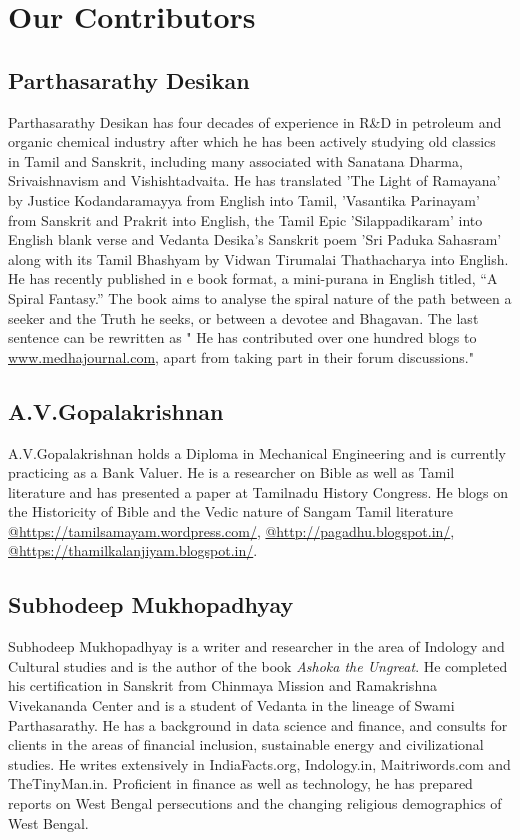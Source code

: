 
\chapter*{Our Contributors }\label{contributors}

\section*{Parthasarathy Desikan}

Parthasarathy Desikan has four decades of experience in R\&D in petroleum and organic chemical industry after which he has been actively studying old classics in Tamil and Sanskrit, including many associated with Sanatana Dharma, Srivaishnavism and Vishishtadvaita. He has translated 'The Light of Ramayana' by Justice Kodandaramayya from English into Tamil, 'Vasantika Parinayam' from Sanskrit and Prakrit into English, the Tamil Epic 'Silappadikaram' into English blank verse and Vedanta Desika’s Sanskrit poem 'Sri Paduka Sahasram' along with its Tamil Bhashyam by Vidwan Tirumalai Thathacharya into English. He has recently published in e book format, a mini-purana in English titled, “A Spiral Fantasy.” The book aims to analyse the spiral nature of the path between a seeker and the Truth he seeks, or between a devotee and Bhagavan. The last sentence can be rewritten as " He has contributed over one hundred blogs to \url{www.medhajournal.com}, apart from taking part in their forum discussions."

\section*{A.V.Gopalakrishnan}

A.V.Gopalakrishnan holds a Diploma in Mechanical Engineering and is currently practicing as a Bank Valuer. He is a researcher on Bible as well as Tamil literature and has presented a paper at Tamilnadu History Congress. He blogs on the Historicity of Bible and the Vedic nature of Sangam Tamil literature \url{@https://tamilsamayam.wordpress.com/}, \url{@http://pagadhu.blogspot.in/}, \url{@https://thamilkalanjiyam.blogspot.in/}.

\section*{Subhodeep Mukhopadhyay}

Subhodeep Mukhopadhyay is a writer and researcher in the area of Indology and Cultural studies and is the author of the book \textit{Ashoka the Ungreat}. He completed his certification in Sanskrit from Chinmaya Mission and Ramakrishna Vivekananda Center and is a student of Vedanta in the lineage of Swami Parthasarathy. He has a background in data science and finance, and consults for clients in the areas of financial inclusion, sustainable energy and civilizational studies. He writes extensively in IndiaFacts.org, Indology.in, Maitriwords.com and TheTinyMan.in. Proficient in finance as well as technology, he has prepared reports on West Bengal persecutions and the changing religious demographics of West Bengal. 

